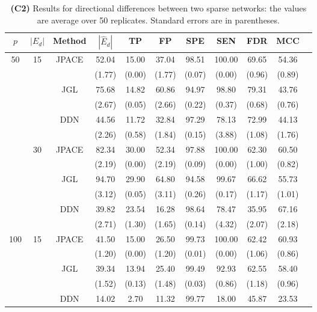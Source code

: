 \documentclass[useAMS,usenatbib,referee]{bio}
\begin{document}
{\begin{table}[htb!]
\caption{{\bf (C2)} Results for directional differences between two sparse
networks: the values are average over 50 replicates.
Standard errors are in parentheses.}
\medskip
\centering
{ %
\begin{tabular}{||c|c|c||c|c|c|c|c|c|c||c} \cline{1-10}
$p$  &  $|E_d|$  & Method & $|\hat{E}_d|$ & TP & FP & SPE & SEN & FDR & MCC \\ \hline 
\multirow{12}{*}{50}  &\multirow{6}{*}{15}  & \multirow{2}{*}{JPACE} &52.04 & 15.00 & 37.04 & 98.51 & 100.00 & 69.65 & 54.36 \\ 
& & & (1.77) & (0.00) & (1.77) & (0.07) & (0.00) & (0.96) & (0.89) \\ \cline{3-10} 
& & \multirow{2}{*}{JGL} & 75.68 & 14.82 & 60.86 & 94.97 & 98.80 & 79.31 & 43.76 \\ 
 & & & (2.67) & (0.05) & (2.66) & (0.22) & (0.37) & (0.68) & (0.76) \\ \cline{3-10} 
& & \multirow{2}{*}{DDN} & 44.56 & 11.72 & 32.84 & 97.29 & 78.13 & 72.99 & 44.13 \\ 
 & & & (2.26) & (0.58) & (1.84) & (0.15) & (3.88) & (1.08) & (1.76) \\\cline{2-10} 
  &\multirow{6}{*}{30}  & \multirow{2}{*}{JPACE} &82.34 & 30.00 & 52.34 & 97.88 & 100.00 & 62.30 & 60.50 \\ 
& & & (2.19) & (0.00) & (2.19) & (0.09) & (0.00) & (1.00) & (0.82) \\ \cline{3-10} 
& & \multirow{2}{*}{JGL} & 94.70 & 29.90 & 64.80 & 94.58 & 99.67 & 66.62 & 55.73 \\ 
 & & & (3.12) & (0.05) & (3.11) & (0.26) & (0.17) & (1.17) & (1.01) \\ \cline{3-10} 
& & \multirow{2}{*}{DDN} & 39.82 & 23.54 & 16.28 & 98.64 & 78.47 & 35.95 & 67.16 \\ 
 & & & (2.71) & (1.30) & (1.65) & (0.14) & (4.32) & (2.07) & (2.18) \\\cline{1-10} 
\multirow{12}{*}{100}  &\multirow{6}{*}{15}  & \multirow{2}{*}{JPACE} &41.50 & 15.00 & 26.50 & 99.73 & 100.00 & 62.42 & 60.93 \\ 
& & & (1.20) & (0.00) & (1.20) & (0.01) & (0.00) & (1.06) & (0.86) \\ \cline{3-10} 
& & \multirow{2}{*}{JGL} & 39.34 & 13.94 & 25.40 & 99.49 & 92.93 & 62.55 & 58.40 \\ 
 & & & (1.52) & (0.13) & (1.48) & (0.03) & (0.86) & (1.18) & (0.96) \\ \cline{3-10} 
& & \multirow{2}{*}{DDN} & 14.02 & 2.70 & 11.32 & 99.77 & 18.00 & 45.87 & 23.53 \\ 

\end{tabular}}
\end{table}}
\end{document}
